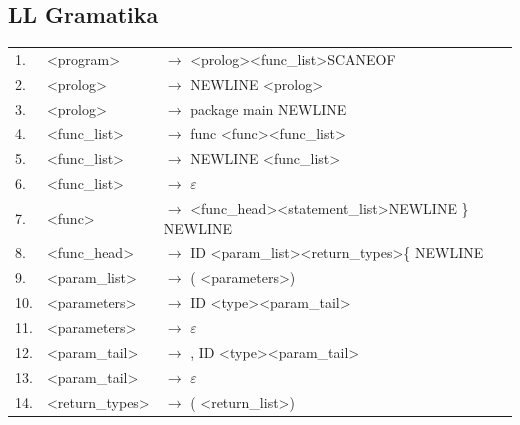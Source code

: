 \documentclass[a4paper,11pt]{article}
\begin{document}
		\subsection{LL Gramatika}\label{subsec:llgram}
			\begin{table}[h!]
				\begin{center}
					\begin{scriptsize}
					\begin{tabular}{lll}
						1. &\textless program\textgreater & $\rightarrow$ \textless prolog\textgreater  \textless func\_list\textgreater  SCANEOF\\
					    2. &\textless prolog\textgreater 	   & $\rightarrow$ NEWLINE \textless prolog\textgreater \\
					    3. &\textless prolog\textgreater 	   & $\rightarrow$ package main NEWLINE\\
					    4. &\textless func\_list\textgreater 	   & $\rightarrow$ func \textless func\textgreater  \textless func\_list\textgreater \\
 						5. &\textless func\_list\textgreater 	   & $\rightarrow$ NEWLINE \textless func\_list\textgreater \\
    					6. &\textless func\_list\textgreater  	   & $\rightarrow$ $\varepsilon$\\
    					7. &\textless func\textgreater  		   & $\rightarrow$ \textless func\_head\textgreater  \textless statement\_list\textgreater  NEWLINE \} NEWLINE\\
    					8. &\textless func\_head\textgreater  	   & $\rightarrow$ ID \textless param\_list\textgreater  \textless return\_types\textgreater  \{ NEWLINE\\
    					9. &\textless param\_list\textgreater  	   & $\rightarrow$ ( \textless parameters\textgreater  )\\
    					10. &\textless parameters\textgreater  	   & $\rightarrow$ ID \textless type\textgreater  \textless param\_tail\textgreater \\
    					11. &\textless parameters\textgreater  	   & $\rightarrow$ $\varepsilon$\\
    					12. &\textless param\_tail\textgreater  	   & $\rightarrow$ , ID \textless type\textgreater  \textless param\_tail\textgreater \\
    					13. &\textless param\_tail\textgreater  	   & $\rightarrow$ $\varepsilon$\\
    					14. &\textless return\_types\textgreater 	   & $\rightarrow$ ( \textless return\_list\textgreater  )\\

\end{tabular}
\end{scriptsize}
\end{center}
\end{table}
\end{document}
